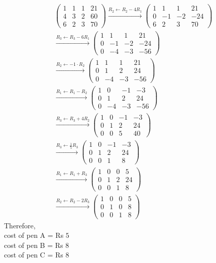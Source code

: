 \documentclass[journal]{IEEEtran}
\begin{document}
\begin{align}
&\left(
\begin{array}{ccc|c}
1 & 1 & 1 & 21 \\
4 & 3 & 2 & 60 \\
6 & 2 & 3 & 70
\end{array}
\right)
\xrightarrow{R_2 \gets R_2 - 4R_1}
\left(
\begin{array}{ccc|c}
1 & 1 & 1 & 21 \\
0 & -1 & -2 & -24 \\
6 & 2 & 3 & 70
\end{array}
\right) \\[12pt]
&\xrightarrow{R_3 \gets R_3 - 6R_1}
\left(
\begin{array}{ccc|c}
1 & 1 & 1 & 21 \\
0 & -1 & -2 & -24 \\
0 & -4 & -3 & -56
\end{array}
\right) \\[12pt]
&\xrightarrow{R_2 \gets -1 \cdot R_2}
\left(
\begin{array}{ccc|c}
1 & 1 & 1 & 21 \\
0 & 1 & 2 & 24 \\
0 & -4 & -3 & -56
\end{array}
\right) \\[12pt]
&\xrightarrow{R_1 \gets R_1 - R_2}
\left(
\begin{array}{ccc|c}
1 & 0 & -1 & -3 \\
0 & 1 & 2 & 24 \\
0 & -4 & -3 & -56
\end{array}
\right) \\[12pt]
&\xrightarrow{R_3 \gets R_3 + 4R_2}
\left(
\begin{array}{ccc|c}
1 & 0 & -1 & -3 \\
0 & 1 & 2 & 24 \\
0 & 0 & 5 & 40
\end{array}
\right) \\[12pt]
&\xrightarrow{R_3 \gets \frac{1}{5} R_3}
\left(
\begin{array}{ccc|c}
1 & 0 & -1 & -3 \\
0 & 1 & 2 & 24 \\
0 & 0 & 1 & 8
\end{array}
\right) \\[12pt]
&\xrightarrow{R_1 \gets R_1 + R_3}
\left(
\begin{array}{ccc|c}
1 & 0 & 0 & 5 \\
0 & 1 & 2 & 24 \\
0 & 0 & 1 & 8
\end{array}
\right) \\[12pt]
&\xrightarrow{R_2 \gets R_2 - 2R_3}
\left(
\begin{array}{ccc|c}
1 & 0 & 0 & 5 \\
0 & 1 & 0 & 8 \\
0 & 0 & 1 & 8
\end{array}
\right)
\end{align}
Therefore,\\
          cost of pen A = Rs $5$\\
          cost of pen B = Rs $8$\\
          cost of pen C = Rs $8$
\end{document}
